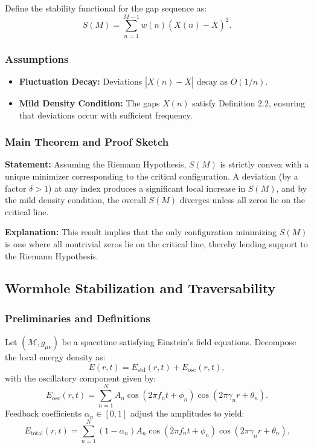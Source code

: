 \documentclass[11pt]{article}
\begin{document}
Define the stability functional for the gap sequence as:
\[
S(M)=\sum_{n=1}^{M-1} w(n)\left( X(n)-\overline{X} \right)^2.
\]

\subsubsection{Assumptions}

\begin{itemize}
    \item \textbf{Fluctuation Decay:} Deviations $\left|X(n)-\overline{X}\right|$ decay as $O(1/n)$.
    \item \textbf{Mild Density Condition:} The gaps $X(n)$ satisfy Definition 2.2, ensuring that deviations occur with sufficient frequency.
\end{itemize}

\subsubsection{Main Theorem and Proof Sketch}

\textbf{Statement:} Assuming the Riemann Hypothesis, $S(M)$ is strictly convex with a unique minimizer corresponding to the critical configuration. A deviation (by a factor $\delta>1$) at any index produces a significant local increase in $S(M)$, and by the mild density condition, the overall $S(M)$ diverges unless all zeros lie on the critical line.

\textbf{Explanation:} This result implies that the only configuration minimizing $S(M)$ is one where all nontrivial zeros lie on the critical line, thereby lending support to the Riemann Hypothesis.

\subsection{Wormhole Stabilization and Traversability}

\subsubsection{Preliminaries and Definitions}

Let $(\mathcal{M}, g_{\mu\nu})$ be a spacetime satisfying Einstein's field equations. Decompose the local energy density as:
\[
E(r,t)=E_{\mathrm{std}}(r,t)+E_{\mathrm{osc}}(r,t),
\]
with the oscillatory component given by:
\[
E_{\mathrm{osc}}(r,t)=\sum_{n=1}^{N} A_n \cos\left(2\pi f_n t+\phi_n\right)\cos\left(2\pi \gamma_n r+\theta_n\right).
\]
Feedback coefficients $\alpha_n \in [0,1]$ adjust the amplitudes to yield:
\[
E_{\mathrm{total}}(r,t)=\sum_{n=1}^{N} (1-\alpha_n) A_n \cos\left(2\pi f_n t+\phi_n\right)\cos\left(2\pi \gamma_n r+\theta_n\right).
\]
\end{document}
